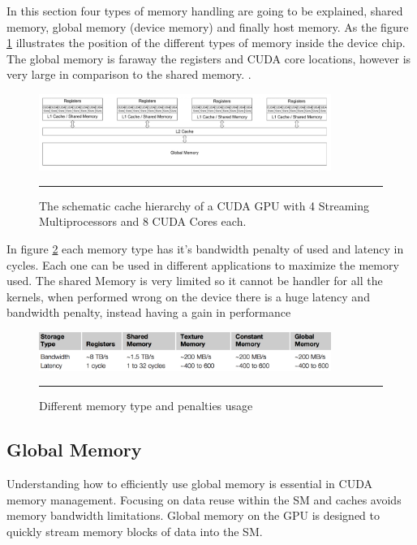 In this section four types of memory handling are going to be explained, shared memory, global memory (device memory) and finally host memory. As the figure \ref{fig:cores} illustrates the position of the different types of memory inside the device chip. The global memory is faraway the registers and CUDA core locations, however is very large in comparison to the shared memory. \cite{cook}.

\begin{figure}[htbp]
	\centering
		\includegraphics[width=0.85\textwidth]{Figures/cores.png}
		\rule{35em}{0.4pt}
	\caption[schematic cache hierarchy of a CUDA GPU]{The schematic cache hierarchy of a CUDA GPU with 4 Streaming Multiprocessors and 8 CUDA Cores each.}
	\label{fig:cores}
\end{figure}


 In figure \ref{fig:memory} each memory type has it's bandwidth penalty of used and latency in cycles. Each one can be used in different applications to maximize the memory used. The shared Memory is very limited so it cannot be handler for all the kernels, when performed wrong on the device there is a huge latency and bandwidth penalty, instead having a gain in performance
 
\begin{figure}[htbp]
	\centering
		\includegraphics[width=0.85\textwidth]{Figures/memory.png}
		\rule{35em}{0.45pt}
	\caption[Different memory types]{Different memory type and penalties usage}
	\label{fig:memory}
\end{figure}

\subsection{Global Memory}

Understanding how to efficiently use global memory is essential in CUDA memory management.
Focusing on data reuse within the SM and caches avoids memory bandwidth limitations. Global memory on the GPU is designed to quickly stream memory blocks of data into the SM.

